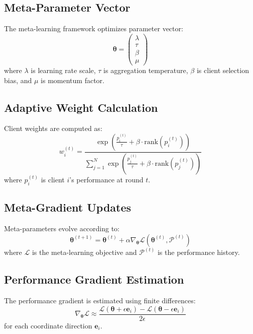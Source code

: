 \documentclass[12pt,a4paper]{article}
\begin{document}
\subsection{Meta-Parameter Vector}

The meta-learning framework optimizes parameter vector:
\begin{equation}
\bm{\theta} = \begin{pmatrix}
\lambda \\
\tau \\
\beta \\
\mu
\end{pmatrix}
\end{equation}
where $\lambda$ is learning rate scale, $\tau$ is aggregation temperature, $\beta$ is client selection bias, and $\mu$ is momentum factor.

\subsection{Adaptive Weight Calculation}

Client weights are computed as:
\begin{equation}
w_i^{(t)} = \frac{\exp\left(\frac{p_i^{(t)}}{\tau} + \beta \cdot \text{rank}(p_i^{(t)})\right)}{\sum_{j=1}^N \exp\left(\frac{p_j^{(t)}}{\tau} + \beta \cdot \text{rank}(p_j^{(t)})\right)}
\end{equation}
where $p_i^{(t)}$ is client $i$'s performance at round $t$.

\subsection{Meta-Gradient Updates}

Meta-parameters evolve according to:
\begin{equation}
\bm{\theta}^{(t+1)} = \bm{\theta}^{(t)} + \alpha \nabla_{\bm{\theta}} \mathcal{L}(\bm{\theta}^{(t)}, \mathcal{P}^{(t)})
\end{equation}
where $\mathcal{L}$ is the meta-learning objective and $\mathcal{P}^{(t)}$ is the performance history.

\subsection{Performance Gradient Estimation}

The performance gradient is estimated using finite differences:
\begin{equation}
\nabla_{\bm{\theta}} \mathcal{L} \approx \frac{\mathcal{L}(\bm{\theta} + \epsilon \mathbf{e}_i) - \mathcal{L}(\bm{\theta} - \epsilon \mathbf{e}_i)}{2\epsilon}
\end{equation}
for each coordinate direction $\mathbf{e}_i$.
\end{document}
